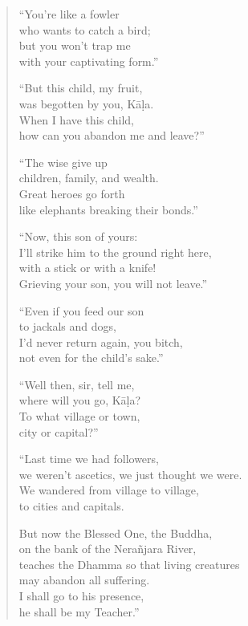 \documentclass[12pt,openany]{book}%
\begin{document}
\begin{verse}
“You’re like a fowler \\
who wants to catch a bird; \\
but you won’t trap me \\
with your captivating form.” 

“But this child, my fruit, \\
was begotten by you, \textsanskrit{Kāḷa}. \\
When I have this child, \\
how can you abandon me and leave?” 

“The wise give up \\
children, family, and wealth. \\
Great heroes go forth \\
like elephants breaking their bonds.” 

“Now, this son of yours: \\
I’ll strike him to the ground right here, \\
with a stick or with a knife! \\
Grieving your son, you will not leave.” 

“Even if you feed our son \\
to jackals and dogs, \\
I’d never return again, you bitch, \\
not even for the child’s sake.” 

“Well then, sir, tell me, \\
where will you go, \textsanskrit{Kāḷa}? \\
To what village or town, \\
city or capital?” 

“Last time we had followers, \\
we weren’t ascetics, we just thought we were. \\
We wandered from village to village, \\
to cities and capitals. 

But now the Blessed One, the Buddha, \\
on the bank of the \textsanskrit{Nerañjara} River, \\
teaches the Dhamma so that living creatures \\
may abandon all suffering. \\
I shall go to his presence, \\
he shall be my Teacher.” 


\end{verse}
\end{document}
